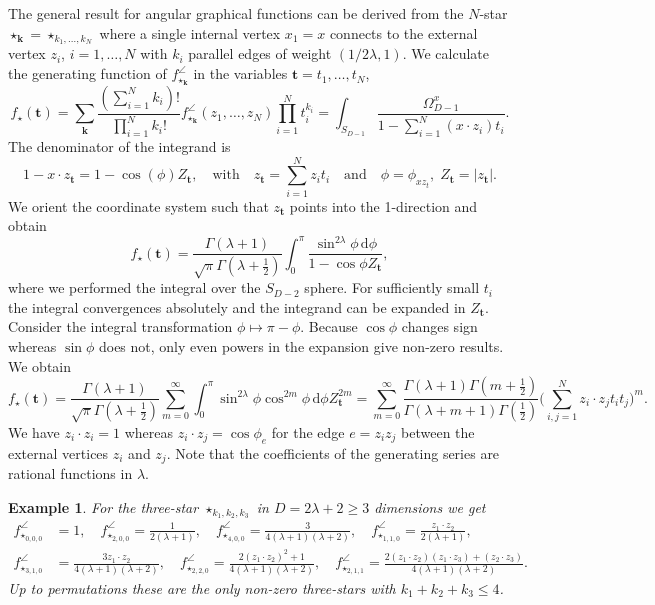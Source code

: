 \documentclass[oneside]{amsart}
\newcommand{\dd}{\mathrm{d}}
\theoremstyle{plain}
\newtheorem{ex}[thm]{Example}
\begin{document}
The general result for angular graphical functions can be derived from the $N$-star $\star_{\mathbf k}=\star_{k_1,\ldots,k_N}$ where a single internal vertex $x_1=x$ connects
to the external vertex $z_i$, $i=1,\ldots,N$ with $k_i$ parallel edges of weight $(1/2\lambda,1)$. We calculate the generating function of $f^\angle_{\star_{\mathbf k}}$
in the variables $\mathbf t=t_1,\ldots,t_N$,
$$
f_\star(\mathbf t)=\sum_{\mathbf k}\frac{(\sum_{i=1}^Nk_i)!}{\prod_{i=1}^Nk_i!}f_{\star_{\mathbf{k}}}^\angle(z_1,\ldots,z_N)\prod_{i=1}^Nt_i^{k_i}
=\int_{S_{D-1}}\frac{\Omega^x_{D-1}}{1-\sum_{i=1}^N(x\cdot z_i)t_i}.
$$
The denominator of the integrand is
$$
1-x\cdot z_{\mathbf t}=1-\cos(\phi)Z_{\mathbf t},\quad\text{with}\quad z_{\mathbf t}=\sum_{i=1}^Nz_it_i\quad\text{and}\quad\phi=\phi_{xz_t},\;Z_{\mathbf t}=|z_{\mathbf t}|.
$$
We orient the coordinate system such that $z_{\mathbf t}$ points into the 1-direction and obtain
$$
f_\star(\mathbf t)=\frac{\Gamma(\lambda+1)}{\sqrt{\pi}\Gamma(\lambda+\frac{1}{2})}\int_0^\pi\frac{\sin^{2\lambda}\phi\,\dd\phi}{1-\cos\phi Z_{\mathbf t}},
$$
where we performed the integral over the $S_{D-2}$ sphere.
For sufficiently small $t_i$ the integral convergences absolutely and the integrand can be expanded in $Z_{\mathbf t}$.
Consider the integral transformation $\phi\mapsto\pi-\phi$. Because $\cos\phi$ changes sign whereas $\sin\phi$ does not, only even powers in the expansion give non-zero results. We obtain
\begin{equation}\label{genstar}
f_\star(\mathbf t)=\frac{\Gamma(\lambda+1)}{\sqrt{\pi}\Gamma(\lambda+\frac{1}{2})}\sum_{m=0}^\infty\int_0^\pi\sin^{2\lambda}\phi\cos^{2m}\phi\,\dd\phi Z_{\mathbf t}^{2m}
=\sum_{m=0}^\infty\frac{\Gamma(\lambda+1)\Gamma(m+\frac{1}{2})}{\Gamma(\lambda+m+1)\Gamma(\frac{1}{2})}\Big(\sum_{i,j=1}^Nz_i\cdot z_j t_it_j\Big)^m.
\end{equation}
We have $z_i\cdot z_i=1$ whereas $z_i\cdot z_j=\cos\phi_e$ for the edge $e=z_iz_j$ between the external vertices $z_i$ and $z_j$.
Note that the coefficients of the generating series are rational functions in $\lambda$.

\begin{ex}\label{angularex1}
For the three-star $\star_{k_1,k_2,k_3}$ in $D=2\lambda+2\geq3$ dimensions we get
\begin{align*}
f^\angle_{\star_{0,0,0}}&=1,\quad f^\angle_{\star_{2,0,0}}=\frac{1}{2(\lambda+1)},\quad f^\angle_{\star_{4,0,0}}=\frac{3}{4(\lambda+1)(\lambda+2)},\quad
 f^\angle_{\star_{1,1,0}}=\frac{z_1\cdot z_2}{2(\lambda+1)},\\
f^\angle_{\star_{3,1,0}}&=\frac{3 z_1\cdot z_2}{4(\lambda+1)(\lambda+2)},\quad f^\angle_{\star_{2,2,0}}=\frac{2(z_1\cdot z_2)^2+1}{4(\lambda+1)(\lambda+2)},\quad
 f^\angle_{\star_{2,1,1}}=\frac{2(z_1\cdot z_2)(z_1\cdot z_3)+(z_2\cdot z_3)}{4(\lambda+1)(\lambda+2)}.
\end{align*}
Up to permutations these are the only non-zero three-stars with $k_1+k_2+k_3\leq4$.
\end{ex}
\end{document}
